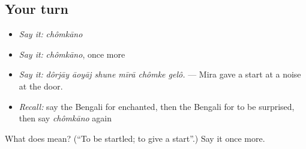 \subsection*{Your turn}
\begin{itemize}
\raggedright
  \item \emph{Say it:} \emph{chômkāno}
  \item \emph{Say it:} \emph{chômkāno}, once more
  \item \emph{Say it:} \emph{dôrjāy āoyāj shune mīrā chômke gelô.} — Mira gave a start at a noise at the door.
  \item \emph{Recall:} say the Bengali for enchanted, then the Bengali for to be surprised, then say \emph{chômkāno} again
\end{itemize}

\begin{tcolorbox}[breakable,colback=teal!4,colframe=teal!35!black,title={Before you move on}]
What does  mean? (\textquotedblleft{}To be startled; to give a start\textquotedblright{}.) Say it once more.
\end{tcolorbox}
